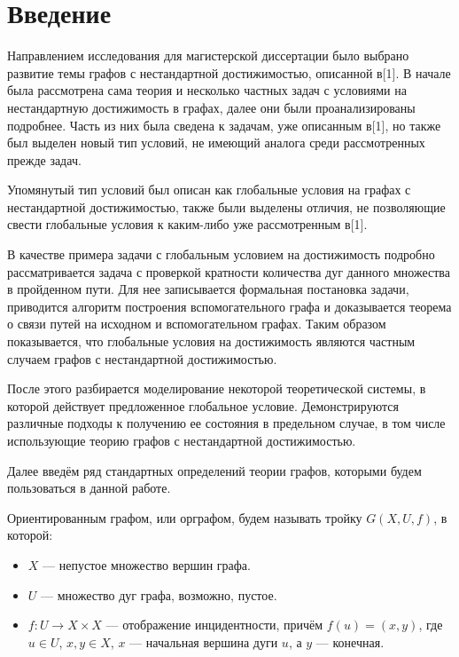 
\section{Введение}

Направлением исследования для магистерской диссертации было выбрано развитие темы графов с нестандартной достижимостью, описанной в[1]. В начале была рассмотрена сама теория и несколько частных задач с условиями на нестандартную достижимость в графах, далее они были проанализированы подробнее. Часть из них была сведена к задачам, уже описанным в[1], но также был выделен новый тип условий, не имеющий аналога среди рассмотренных прежде задач.

Упомянутый тип условий был описан как глобальные условия на графах с нестандартной достижимостью, также были выделены отличия, не позволяющие свести глобальные условия к каким-либо уже рассмотренным в[1]. 

В качестве примера задачи с глобальным условием на достижимость подробно рассматривается задача с проверкой кратности количества дуг данного множества в пройденном пути. Для нее записывается формальная постановка задачи, приводится алгоритм построения вспомогательного графа и доказывается теорема о связи путей на исходном и вспомогательном графах. Таким образом показывается, что глобальные условия на достижимость являются частным случаем графов с нестандартной достижимостью. 

После этого разбирается моделирование некоторой теоретической системы, в которой действует предложенное глобальное условие. Демонстрируются различные подходы к получению ее состояния в предельном случае, в том числе использующие теорию графов с нестандартной достижимостью. 

Далее введём ряд стандартных определений теории графов, которыми будем пользоваться в данной работе. 

\begin{definition}
	Ориентированным графом, или орграфом, будем называть тройку $G(X,U,f)$, в которой:
	\begin{itemize}
		\item $X$ --- непустое множество вершин графа.
		\item $U$ --- множество дуг графа, возможно, пустое.
		\item $f:U\to X \times X$ --- отображение инцидентности, причём $f(u) = (x, y)$, где $u \in U$, $x, y \in X$, $x$ --- начальная вершина дуги $u$, а $y$ --- конечная.
	\end{itemize}
\end{definition}

